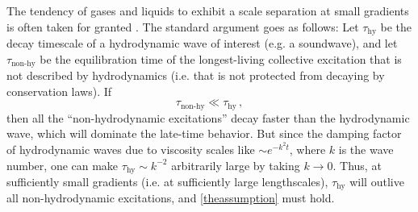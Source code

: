 \documentclass[a4paper, amsfonts, amssymb, amsmath, reprint, showkeys, nofootinbib, twoside, onecolumn,notitlepage,,longbibliography]{revtex4-2}
\theoremstyle{definition}
\theoremstyle{theorem}
\theoremstyle{corollary}
\begin{document}
The tendency of gases and liquids to exhibit a scale separation at small gradients is often taken for granted \cite{landau6,rezzolla_book,andersson2007review,Romatschke2017}. The standard argument goes as follows: Let $\tau_{\text{hy}}$ be the decay timescale of a hydrodynamic wave of interest (e.g. a soundwave), and let $\tau_{\text{non-hy}}$ be the equilibration time of the longest-living collective excitation that is not described by hydrodynamics (i.e. that is not protected from decaying by conservation laws). If
\begin{equation}\label{theassumption}
    \tau_{\text{non-hy}} \ll \tau_{\text{hy}} \, ,
\end{equation}
then all the ``non-hydrodynamic excitations'' decay faster than the hydrodynamic wave, which will dominate the late-time behavior. But since the damping factor of hydrodynamic waves due to viscosity scales like $\sim e^{-k^2 t}$, where $k$ is the wave number, one can make $\tau_{\text{hy}}\sim k^{-2}$ arbitrarily large by taking $k\rightarrow 0$. Thus, at sufficiently small gradients (i.e. at sufficiently large lengthscales), $\tau_{\text{hy}}$ will outlive all non-hydrodynamic excitations, and  \eqref{theassumption} must hold.
\end{document}
